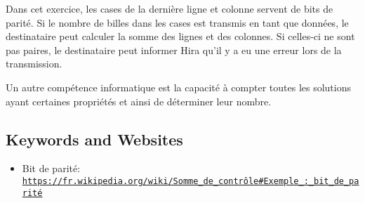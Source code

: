 \documentclass[a4paper,11pt]{report}
\newcommand{\BrochureUrlText}[1]{\texttt{#1}}
\begin{document}
Dans cet exercice, les cases de la dernière ligne et colonne servent de bits de parité. Si le nombre de billes dans les cases est transmis en tant que données, le destinataire peut calculer la somme des lignes et des colonnes. Si celles-ci ne sont pas paires, le destinataire peut informer Hira qu’il y a eu une erreur lors de la transmission.

Un autre compétence informatique est la capacité à compter toutes les solutions ayant certaines propriétés et ainsi de déterminer leur nombre.

{\raggedright

\subsection*{Keywords and Websites}

\begin{itemize}
  \item Bit de parité: \href{https://fr.wikipedia.org/wiki/Somme_de_contr\%C3\%B4le\#Exemple_:_bit_de_parit\%C3\%A9}{\BrochureUrlText{https://fr.wikipedia.org/wiki/Somme\_de\_contrôle\#Exemple\_:\_bit\_de\_parité}}
\end{itemize}


}
\end{document}
